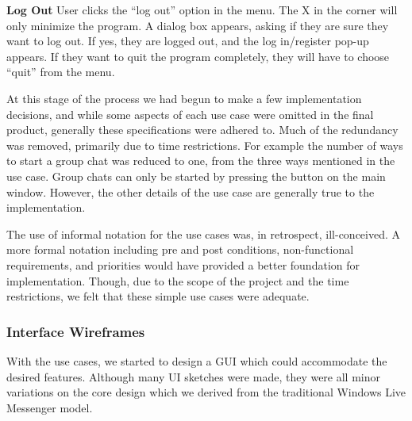 {\bf Log Out}
User clicks the ``log out'' option in the menu. The X in the corner will only minimize the program. A dialog box appears, asking if they are sure they want to log out. If yes, they are logged out, and the log in/register pop-up appears. If they want to quit the program completely, they will have to choose ``quit'' from the menu.

At this stage of the process we had begun to make a few implementation decisions, and while some aspects of each use case were omitted in the final product, generally these specifications were adhered to. Much of the redundancy was removed, primarily due to time restrictions. For example the number of ways to start a group chat was reduced to one, from the three ways mentioned in the use case. Group chats can only be started by pressing the button on the main window. However, the other details of the use case are generally true to the implementation.

The use of informal notation for the use cases was, in retrospect, ill-conceived. A more formal notation including pre and post conditions, non-functional requirements, and priorities would have provided a better foundation for implementation. Though, due to the scope of the project and the time restrictions, we felt that these simple use cases were adequate.

\subsubsection{Interface Wireframes}

With the use cases, we started to design a GUI which could accommodate the desired features. Although many UI sketches were made, they were all minor variations on the core design which we derived from the traditional Windows Live Messenger model.


